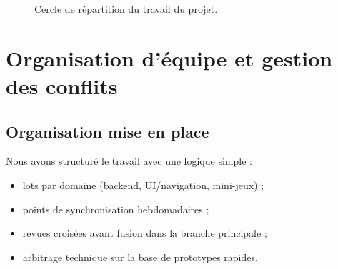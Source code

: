 \documentclass[11pt,a4paper]{article}
\begin{document}
\begin{figure}[h]
  \centering
  \caption{Cercle de répartition du travail du projet.}
\end{figure}

\section{Organisation d'équipe et gestion des conflits}
\subsection{Organisation mise en place}
Nous avons structuré le travail avec une logique simple :
\begin{itemize}[leftmargin=1.2cm]
  \item lots par domaine (backend, UI/navigation, mini-jeux) ;
  \item points de synchronisation hebdomadaires ;
  \item revues croisées avant fusion dans la branche principale ;
  \item arbitrage technique sur la base de prototypes rapides.
\end{itemize}
\end{document}
